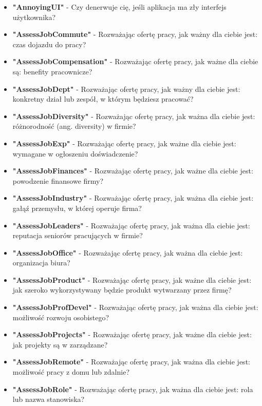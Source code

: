 \begin{appendices}
    \begin{itemize}
        \item \textbf{"AnnoyingUI"} - Czy denerwuje cię, jeśli aplikacja ma zły interfejs użytkownika?
        \item \textbf{"AssessJobCommute"} - Rozważając ofertę pracy, jak ważny dla ciebie jest: czas dojazdu do pracy?
        \item \textbf{"AssessJobCompensation"} - Rozważając ofertę pracy, jak ważne dla ciebie są: benefity pracownicze?
        \item \textbf{"AssessJobDept"} - Rozważając ofertę pracy, jak ważny dla ciebie jest: konkretny dział lub zespół, w którym będziesz pracować?
        \item \textbf{"AssessJobDiversity"} - Rozważając ofertę pracy, jak ważna dla ciebie jest: różnorodność (ang. diversity) w firmie?
        \item \textbf{"AssessJobExp"} - Rozważając ofertę pracy, jak ważne dla ciebie jest: wymagane w ogłoszeniu doświadczenie?
        \item \textbf{"AssessJobFinances"} - Rozważając ofertę pracy, jak ważne dla ciebie jest: powodzenie finansowe firmy?
        \item \textbf{"AssessJobIndustry"} - Rozważając ofertę pracy, jak ważna dla ciebie jest: gałąź przemysłu, w której operuje firma?
        \item \textbf{"AssessJobLeaders"} - Rozważając ofertę pracy, jak ważna dla ciebie jest: reputacja seniorów pracujących w firmie?
        \item \textbf{"AssessJobOffice"} - Rozważając ofertę pracy, jak ważna dla ciebie jest: organizacja biura?
        \item \textbf{"AssessJobProduct"} - Rozważając ofertę pracy, jak ważne dla ciebie jest: jak szeroko wykorzystywany będzie produkt wytwarzany przez firmę?
        \item \textbf{"AssessJobProfDevel"} - Rozważając ofertę pracy, jak ważna dla ciebie jest: możliwość rozwoju osobistego?
        \item \textbf{"AssessJobProjects"} - Rozważając ofertę pracy, jak ważne dla ciebie jest: jak projekty są w zarządzane?
        \item \textbf{"AssessJobRemote"} - Rozważając ofertę pracy, jak ważna dla ciebie jest: możliwość pracy z domu lub zdalnie?
        \item \textbf{"AssessJobRole"} - Rozważając ofertę pracy, jak ważna dla ciebie jest: rola lub nazwa stanowiska?

\end{itemize}
\end{appendices}
